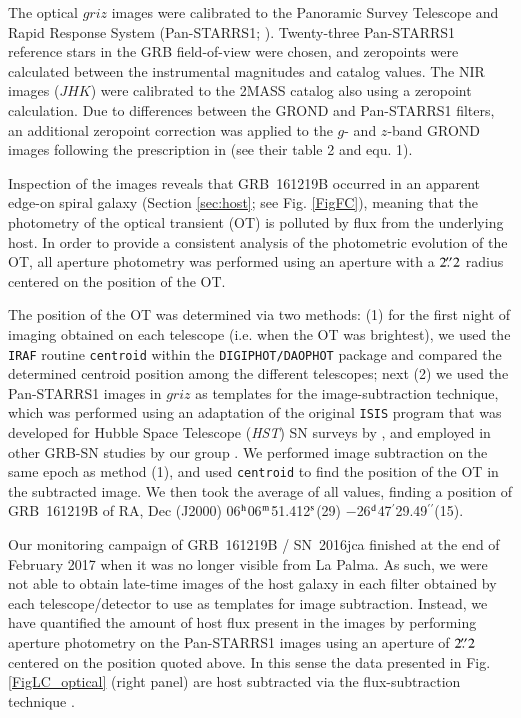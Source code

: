 \documentclass[traditabstract,longauth]{aa}
\begin{document}
The optical $griz$ images were calibrated to the Panoramic Survey Telescope and Rapid Response System (Pan-STARRS1; \citealt{Chambers16,Flewelling16}).  Twenty-three Pan-STARRS1 reference stars in the GRB field-of-view were chosen, and zeropoints were calculated between the instrumental magnitudes and catalog values.  The NIR images ($JHK$) were calibrated to the 2MASS catalog \citep{Kleinmann94} also using a zeropoint calculation.  Due to differences between the GROND and Pan-STARRS1 filters, an additional zeropoint correction was applied to the $g$- and $z$-band GROND images following the prescription in \citet{Finkbeiner16} (see their table 2 and equ. 1).

Inspection of the images reveals that GRB~161219B occurred in an apparent edge-on spiral galaxy (Section \ref{sec:host}; see Fig. \ref{FigFC}), meaning that the photometry of the optical transient (OT) is polluted by flux from the underlying host.  In order to provide a consistent analysis of the photometric evolution of the OT, all aperture photometry was performed using an aperture with a $2\hbox{$.\!\!^{\prime\prime}$}2$ radius centered on the position of the OT.

The position of the OT was determined via two methods: (1) for the first night of imaging obtained on each telescope (i.e. when the OT was brightest), we used the \texttt{IRAF} routine \texttt{centroid} within the \texttt{DIGIPHOT/DAOPHOT} package and compared the determined centroid position among the different telescopes; next (2) we used the Pan-STARRS1 images in $griz$ as templates for the image-subtraction technique, which was performed using an adaptation of the original \texttt{ISIS} program \citep{Alard98,Alard2000} that was developed for Hubble Space Telescope (\emph{HST}) SN surveys by \citet{Strolger04}, and employed in other GRB-SN studies by our group \citep{Cano2011a,Cano+14,Cano15}.  We performed image subtraction on the same epoch as method (1), and used \texttt{centroid} to find the position of the OT in the subtracted image.  We then took the average of all values, finding a position of GRB~161219B of RA, Dec (J2000) 06$^{\rm h}$06$^{\rm m}$51.412$^{\rm s}$(29) $-$26$^{\rm d}$47$^{\prime}$29.49$^{\prime\prime}$(15).

Our monitoring campaign of GRB~161219B / SN~2016jca finished at the end of February 2017 when it was no longer visible from La Palma.  As such, we were not able to obtain late-time images of the host galaxy in each filter obtained by each telescope/detector to use as templates for image subtraction.  Instead, we have quantified the amount of host flux present in the images by performing aperture photometry on the Pan-STARRS1 images using an aperture of $2\hbox{$.\!\!^{\prime\prime}$}2$ centered on the position quoted above.  In this sense the data presented in Fig. \ref{FigLC_optical} (right panel) are host subtracted via the flux-subtraction technique \citep{Cano14,Cano2016,Volnova2016b}.
\end{document}
